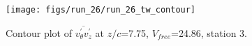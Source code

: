 \begin{figure}[H]
\centering
\texttt{[image: figs/run\_26/run\_26\_tw\_contour]}
\caption{Contour plot of $\overline{v_{\theta}^{\prime} v_{z}^{\prime}}$ at $z/c$=7.75, $V_{free}$=24.86, station 3.}
\label{fig:run_26_tw_contour}
\end{figure}



